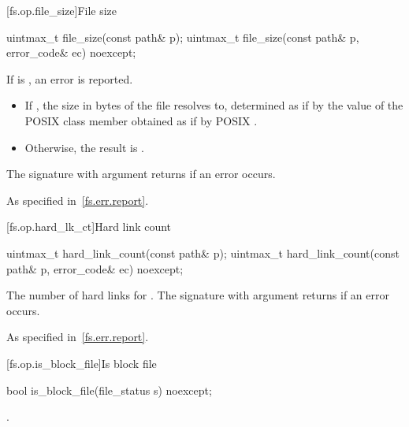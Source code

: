 [fs.op.file_size]{File size}

%
\begin{itemdecl}
uintmax_t file_size(const path& p);
uintmax_t file_size(const path& p, error_code& ec) noexcept;
\end{itemdecl}

\begin{itemdescr}
\pnum
\effects
If  is , an error is reported.

\pnum
\returns
\begin{itemize}
\item
  If , the size in bytes of the file
   resolves to, determined as if by the value of the POSIX 
  class member  obtained as if by POSIX .
\item
  Otherwise, the result is .
\end{itemize}
The signature with argument  returns 
if an error occurs.

\pnum
\throws As specified in~\ref{fs.err.report}.
\end{itemdescr}


[fs.op.hard_lk_ct]{Hard link count}

%
\begin{itemdecl}
uintmax_t hard_link_count(const path& p);
uintmax_t hard_link_count(const path& p, error_code& ec) noexcept;
\end{itemdecl}

\begin{itemdescr}
\pnum
\returns The number of hard links for . The signature
  with argument  returns 
  if an error occurs.

\pnum
\throws As specified in~\ref{fs.err.report}.
\end{itemdescr}


[fs.op.is_block_file]{Is block file}

%
\begin{itemdecl}
bool is_block_file(file_status s) noexcept;
\end{itemdecl}

\begin{itemdescr}
\pnum
\returns {}.
\end{itemdescr}

